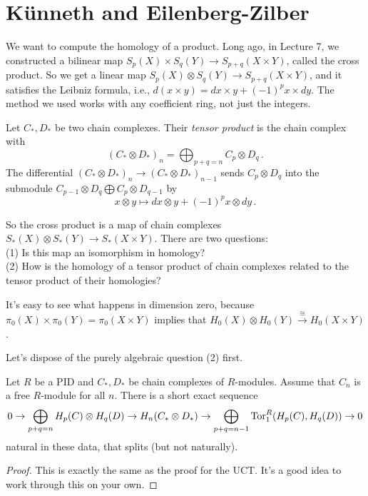\section{K\"{u}nneth and Eilenberg-Zilber}
We want to compute the homology of a product. Long ago, in Lecture 7, we constructed a bilinear map $S_p(X)\times S_q(Y)\to S_{p+q}(X\times Y)$, called the cross product. So we get a linear map $S_p(X)\otimes S_q(Y)\to S_{p+q}(X\times Y)$, and it satisfies the Leibniz formula, i.e., $d(x\times y)=dx\times y+(-1)^px\times dy$. The method we used works with any coefficient ring, not just the integers. 
\begin{definition}
Let $C_\ast,D_\ast$ be two chain complexes. Their {\em tensor product} is 
the chain complex with
\[
(C_\ast\otimes D_\ast)_n=\bigoplus_{p+q=n}C_p\otimes D_q\,.
\]
The differential $(C_\ast\otimes D_\ast)_n\to (C_\ast\otimes D_\ast)_{n-1}$ sends $C_p\otimes D_q$ into the submodule $C_{p-1}\otimes D_q\bigoplus C_p\otimes D_{q-1}$ by 
\[
x\otimes y\mapsto dx\otimes y+(-1)^p x\otimes dy\,.
\]
\end{definition}
So the cross product is a map of chain complexes $S_\ast(X)\otimes S_\ast(Y)\to S_\ast(X\times Y)$. There are two questions:\\
(1) Is this map an isomorphism in homology? \\
(2) How is the homology of a tensor product of chain complexes related to the
tensor product of their homologies? 

It's easy to see what happens in dimension zero, because 
$\pi_0(X)\times \pi_0(Y)=\pi_0(X\times Y)$
implies that 
$H_0(X)\otimes H_0(Y)\xrightarrow{\cong}H_0(X\times Y)$.

Let's dispose of the purely algebraic question (2) first. 

\begin{theorem}
Let $R$ be a PID and $C_\ast,D_\ast$ be chain complexes of $R$-modules. 
Assume that $C_n$ is a free $R$-module for all $n$. There is a short
exact sequence
\begin{equation*}
0\to\bigoplus_{p+q=n} H_p(C)\otimes H_q(D)\to H_n(C_\ast\otimes D_\ast)
\to \bigoplus_{p+q=n-1}\operatorname{Tor}^R_1( H_p(C), H_q(D))\to 0
\end{equation*}
natural in these data, that splits (but not naturally).
\end{theorem}
\begin{proof}
This is exactly the same as the proof for the UCT. It's a good idea to work through this on your own.
\end{proof}


